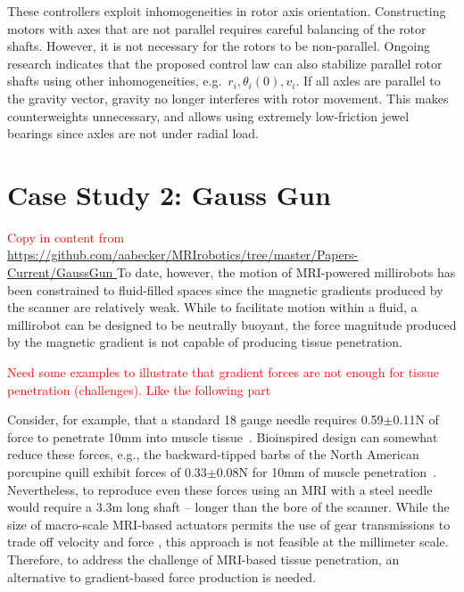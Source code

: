 \documentclass[graybox,usenames]{svmult}
\newcommand{\todo}[1]{\textcolor{red}{\footnotesize \textsf{#1}}}
\begin{document}
    
These controllers exploit inhomogeneities in rotor axis orientation.  Constructing motors with axes that are not parallel requires careful balancing of the rotor shafts.  However, it is not necessary for the rotors to be non-parallel. Ongoing research indicates that the proposed control law can also stabilize parallel rotor shafts using other inhomogeneities, e.g.~$r_i, \theta_i(0), v_i$.  If all axles are parallel to the gravity vector, gravity no longer interferes with rotor movement.  This makes counterweights unnecessary, and allows using extremely low-friction jewel bearings since axles are not under radial load.



\section{Case Study 2: Gauss Gun}
\todo{ Copy in content from \url{https://github.com/aabecker/MRIrobotics/tree/master/Papers-Current/GaussGun  } }
To date, however, the motion of MRI-powered millirobots has been constrained to fluid-filled spaces since the magnetic gradients produced by the scanner are relatively weak. While to facilitate motion within a fluid, a millirobot can be designed to be neutrally buoyant, the force magnitude produced by the magnetic gradient is not capable of producing tissue penetration.

\todo{Need some examples to illustrate that gradient forces are not enough for tissue penetration (challenges). Like the following part}

Consider, for example, that a standard 18 gauge needle requires 0.59$\pm$0.11N of force to penetrate 10mm into muscle tissue~\cite{Cho26122012}. Bioinspired design can somewhat reduce these forces, e.g., the backward-tipped barbs of the North American porcupine quill exhibit forces of 0.33$\pm$0.08N for 10mm of muscle penetration~\cite{Cho26122012}. Nevertheless, to reproduce even these forces using an MRI with a steel needle would require a 3.3m long shaft -- longer than the bore of the scanner. While the size of macro-scale MRI-based actuators permits the use of gear transmissions to trade off velocity and force \cite{Vartholomeos2012,Felfoul2014}, this approach is not feasible at the millimeter scale. Therefore, to address the challenge of MRI-based tissue penetration, an alternative to gradient-based force production is needed.  
\end{document}
